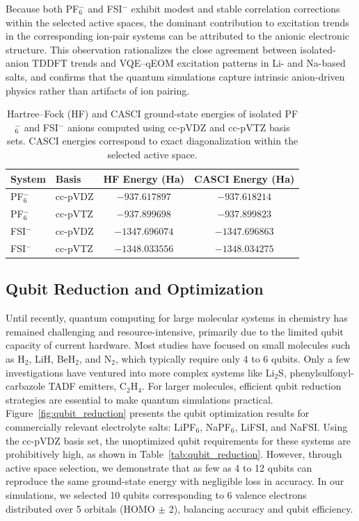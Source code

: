 \documentclass[num-refs]{wiley-article}
\begin{document}
Because both PF$_6^-$ and FSI$^-$ exhibit modest and stable correlation corrections within the selected active spaces, the dominant contribution to excitation trends in the corresponding ion-pair systems can be attributed to the anionic electronic structure. This observation rationalizes the close agreement between isolated-anion TDDFT trends and VQE–qEOM excitation patterns in Li- and Na-based salts, and confirms that the quantum simulations capture intrinsic anion-driven physics rather than artifacts of ion pairing.

\begin{table}[htbp]
\centering
\caption{Hartree--Fock (HF) and CASCI ground-state energies of isolated PF$_6^-$ and FSI$^-$ anions computed using cc-pVDZ and cc-pVTZ basis sets. CASCI energies correspond to exact diagonalization within the selected active space.}
\label{tab:anion_casci}
\begin{tabular}{l l c c}
\hline
System & Basis & HF Energy (Ha) & CASCI Energy (Ha) \\
\hline
PF$_6^-$ & cc-pVDZ & $-937.617897$ & $-937.618214$ \\
PF$_6^-$ & cc-pVTZ & $-937.899698$ & $-937.899823$ \\
FSI$^-$  & cc-pVDZ & $-1347.696074$ & $-1347.696863$ \\
FSI$^-$  & cc-pVTZ & $-1348.033556$ & $-1348.034275$ \\
\hline
\end{tabular}
\end{table}

\subsection{Qubit Reduction and Optimization}
Until recently, quantum computing for large molecular systems in chemistry has remained challenging and resource-intensive, primarily due to the limited qubit capacity of current hardware. Most studies have focused on small molecules such as H$_2$, LiH\cite{zhang2022variational}, BeH$_2$, and N$_2$, which typically require only 4 to 6 qubits\cite{ghosh2023deep}. Only a few investigations have ventured into more complex systems like Li$_2$S\cite{rice2021quantum}, phenylsulfonyl-carbazole TADF emitters\cite{gao2021applications}, C$_2$H$_4$\cite{cao2021towards}. For larger molecules, efficient qubit reduction strategies are essential to make quantum simulations practical. Figure~\ref{fig:qubit_reduction} presents the qubit optimization results for commercially relevant electrolyte salts: LiPF$_6$, NaPF$_6$, LiFSI, and NaFSI. Using the cc-pVDZ basis set, the unoptimized qubit requirements for these systems are prohibitively high, as shown in Table~\ref{tab:qubit_reduction}. However, through active space selection, we demonstrate that as few as 4 to 12 qubits can reproduce the same ground-state energy with negligible loss in accuracy. In our simulations, we selected 10 qubits corresponding to 6 valence electrons distributed over 5 orbitals (HOMO $\pm$ 2), balancing accuracy and qubit efficiency.
\end{document}
